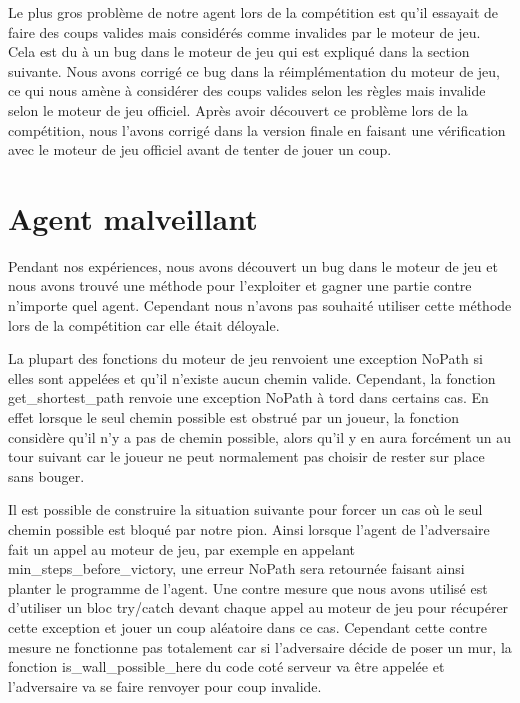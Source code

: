 \documentclass[12pt]{article}
\begin{document}
Le plus gros problème de notre agent lors de la compétition est qu'il essayait de faire des coups valides mais considérés comme invalides par le moteur de jeu. Cela est du à un bug dans le moteur de jeu qui est expliqué dans la section suivante. Nous avons corrigé ce bug dans la réimplémentation du moteur de jeu, ce qui nous amène à considérer des coups valides selon les règles mais invalide selon le moteur de jeu officiel. Après avoir découvert ce problème lors de la compétition, nous l'avons corrigé dans la version finale en faisant une vérification avec le moteur de jeu officiel avant de tenter de jouer un coup. 

\section*{Agent malveillant}

Pendant nos expériences, nous avons découvert un bug dans le moteur de jeu et nous avons trouvé une méthode pour l'exploiter et gagner une partie contre n'importe quel agent. Cependant nous n'avons pas souhaité utiliser cette méthode lors de la compétition car elle était déloyale. 

La plupart des fonctions du moteur de jeu renvoient une exception NoPath si elles sont appelées et qu'il n'existe aucun chemin valide. Cependant, la fonction get\_shortest\_path renvoie une exception NoPath à tord dans certains cas. En effet lorsque le seul chemin possible est obstrué par un joueur, la fonction considère qu'il n'y a pas de chemin possible, alors qu'il y en aura forcément un au tour suivant car le joueur ne peut normalement pas choisir de rester sur place sans bouger.

Il est possible de construire la situation suivante pour forcer un cas où le seul chemin possible est bloqué par notre pion. Ainsi lorsque l'agent de l'adversaire fait un appel au moteur de jeu, par exemple en appelant min\_steps\_before\_victory, une erreur NoPath sera retournée faisant ainsi planter le programme de l'agent. Une contre mesure que nous avons utilisé est d'utiliser un bloc try/catch devant chaque appel au moteur de jeu pour récupérer cette exception et jouer un coup aléatoire dans ce cas. Cependant cette contre mesure ne fonctionne pas totalement car si l'adversaire décide de poser un mur, la fonction is\_wall\_possible\_here du code coté serveur va être appelée et l'adversaire va se faire renvoyer pour coup invalide. 
\end{document}
